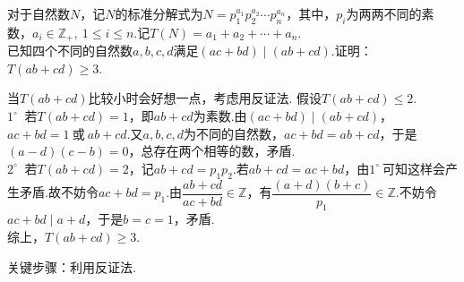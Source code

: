 \documentclass[cn,hazy,black,10pt,normal]{elegantnote}
\newenvironment{guess}{
  \color{guess}}{\newline \color{black}}
\newcommand{\cor}{~\textit{或}~}
\newcommand{\buzhou}[1]{$#1^{\circ} \ $}
\begin{document}
\begin{problem} %
	对于自然数$N$，记$N$的标准分解式为$N=p_1^{a_1}p_2^{a_2} \cdots p_n^{a_n}$，其中，$p_i$为两两不同的素数，$a_i \in \mathbb{Z}_{+},~1 \leq i \leq n$.记$T(N)=a_1+a_2+ \cdots + a_n$. \\
	已知四个不同的自然数$a,b,c,d$满足$(ac+bd) \mid (ab+cd)$.证明：$T(ab+cd) \geq 3$.
\end{problem}
\begin{solution}
	\begin{guess}
		当$T(ab+cd)$比较小时会好想一点，考虑用反证法.
	\end{guess}
	假设$T(ab+cd) \leq 2$. \\
	\buzhou{1} 若$T(ab+cd)=1$，即$ab+cd$为素数.由$(ac+bd) \mid (ab+cd)$，$ac+bd=1\cor ab+cd$.又$a,b,c,d$为不同的自然数，$ac+bd=ab+cd$，于是$(a-d)(c-b)=0$，总存在两个相等的数，矛盾. \\
	\buzhou{2} 若$T(ab+cd)=2$，记$ab+cd=p_1p_2$.若$ab+cd=ac+bd$，由\buzhou{1}可知这样会产生矛盾.故不妨令$ac+bd=p_1$.由$\dfrac{ab+cd}{ac+bd} \in \mathbb{Z}$，有$\dfrac{(a+d)(b+c)}{p_1} \in \mathbb{Z}$.不妨令$ac+bd \mid a+d$，于是$b=c=1$，矛盾. \\
	综上，$T(ab+cd) \geq 3$.
\end{solution}
\begin{remark}
	关键步骤：利用反证法.
\end{remark}
\end{document}

